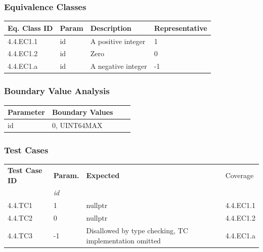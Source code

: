 \documentclass[11pt]{article}
\begin{document}
\subsubsection*{Equivalence Classes}
\label{sec:orga062896}
\begin{center}
\begin{tabularx}{\textwidth}{lXXX}
\hline
\textbf{Eq. Class ID} & \textbf{Param} & \textbf{Description} & \textbf{Representative}\\
\hline
4.4.EC1.1 & id & A positive integer & 1\\
\hline
4.4.EC1.2 & id & Zero & 0\\
\hline
4.4.EC1.a & id & A negative integer & -1\\
\hline
\end{tabularx}
\end{center}
\subsubsection*{Boundary Value Analysis}
\label{sec:orgb4df3f0}
\begin{center}
\begin{tabularx}{\textwidth}{lXXX}
\hline
Parameter & Boundary Values\\
\hline
id & 0, UINT64\textunderscore{}MAX\\
\hline
\end{tabularx}
\end{center}
\subsubsection*{Test Cases}
\label{sec:org01d53ed}
\begin{center}
\begin{tabularx}{\textwidth}{lXXX}
\hline
\textbf{Test Case ID} & \textbf{Param.} & \textbf{Expected} & Coverage\\
 & \textit{id} &  & \\
\hline
4.4.TC1 & 1 & nullptr & 4.4.EC1.1\\
\hline
4.4.TC2 & 0 & nullptr & 4.4.EC1.2\\
\hline
4.4.TC3 & -1 & Disallowed by type checking, TC implementation omitted & 4.4.EC1.a\\
\hline
\end{tabularx}
\end{center}
\end{document}
